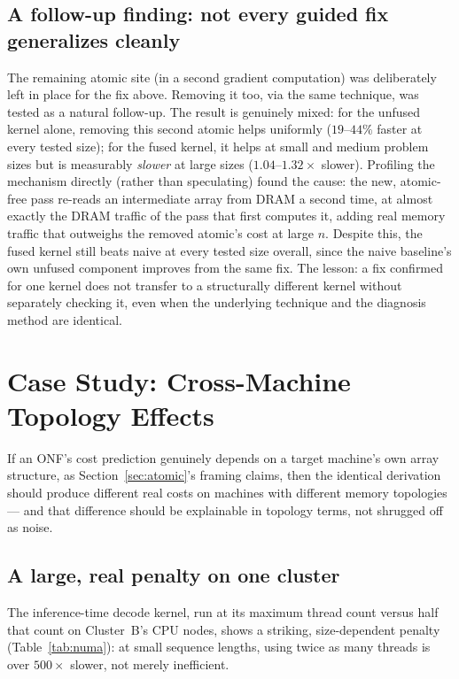 \documentclass[conference]{IEEEtran}
\begin{document}
\subsection{A follow-up finding: not every guided fix generalizes cleanly}

The remaining atomic site (in a second gradient computation) was
deliberately left in place for the fix above. Removing it too, via the
same technique, was tested as a natural follow-up. The result is
genuinely mixed: for the unfused kernel alone, removing this second
atomic helps uniformly ($19$--$44\%$ faster at every tested size); for
the fused kernel, it helps at small and medium problem sizes but is
measurably \emph{slower} at large sizes ($1.04$--$1.32\times$ slower).
Profiling the mechanism directly (rather than speculating) found the
cause: the new, atomic-free pass re-reads an intermediate array from
DRAM a second time, at almost exactly the DRAM traffic of the pass
that first computes it, adding real memory traffic that outweighs the
removed atomic's cost at large $n$. Despite this, the fused kernel
still beats naive at every tested size overall, since the naive
baseline's own unfused component improves from the same fix. The
lesson: a fix confirmed for one kernel does not transfer to a
structurally different kernel without separately checking it, even
when the underlying technique and the diagnosis method are identical.

\section{Case Study: Cross-Machine Topology Effects}
\label{sec:topology}

If an ONF's cost prediction genuinely depends on a target machine's own
array structure, as Section~\ref{sec:atomic}'s framing claims, then the
identical derivation should produce different real costs on machines
with different memory topologies --- and that difference should be
explainable in topology terms, not shrugged off as noise.

\subsection{A large, real penalty on one cluster}

The inference-time decode kernel, run at its maximum thread count
versus half that count on Cluster~B's CPU nodes, shows a striking,
size-dependent penalty (Table~\ref{tab:numa}): at small sequence
lengths, using twice as many threads is over $500\times$ slower, not
merely inefficient.
\end{document}
